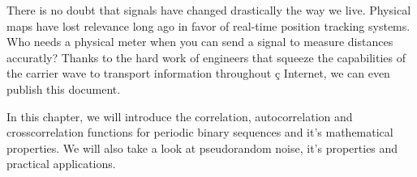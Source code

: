 There is no doubt that signals have changed drastically the way we live.
Physical maps have lost relevance long ago in favor of real-time position
tracking systems. Who needs a physical meter when you can send a signal to
measure distances accuratly?  Thanks to the hard work of engineers that squeeze
the capabilities of the carrier wave to transport information throughout ç
Internet, we can even publish this document. 

In this chapter, we will introduce the correlation, autocorrelation and
crosscorrelation functions for periodic binary sequences and it's mathematical
properties. We will also take a look at pseudorandom noise, it's properties and
practical applications.

 
